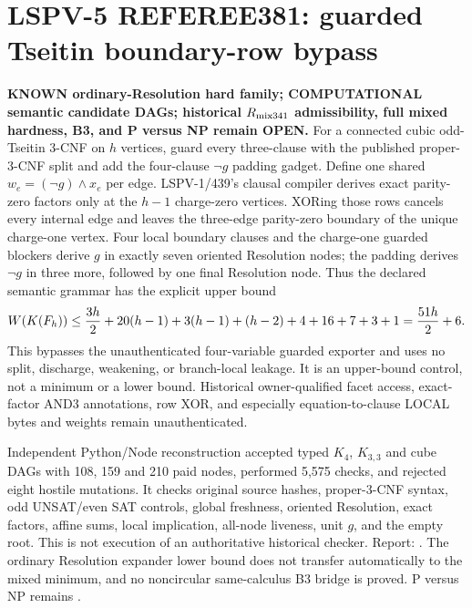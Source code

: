 \section*{LSPV-5 REFEREE381: guarded Tseitin boundary-row bypass}
\textbf{KNOWN ordinary-Resolution hard family; COMPUTATIONAL semantic candidate DAGs; historical $R_{\rm mix341}$ admissibility, full mixed hardness, B3, and P versus NP remain OPEN.}
For a connected cubic odd-Tseitin 3-CNF on $h$ vertices, guard every
three-clause with the published proper-3-CNF split and add the four-clause
$\neg g$ padding gadget.  Define one shared
$w_e=(\neg g)\wedge x_e$ per edge.  LSPV-1/439's clausal compiler derives
exact parity-zero factors only at the $h-1$ charge-zero vertices.  XORing
those rows cancels every internal edge and leaves the three-edge parity-zero
boundary of the unique charge-one vertex.  Four local boundary clauses and
the charge-one guarded blockers derive $g$ in exactly seven oriented
Resolution nodes; the padding derives $\neg g$ in three more, followed by one
final Resolution node.  Thus the declared semantic grammar has the explicit
upper bound
\[
 W(K(F_h))\le {3h\over2}+20(h-1)+3(h-1)+(h-2)+4+16+7+3+1
 ={51h\over2}+6.
\]
This bypasses the unauthenticated four-variable guarded exporter and uses no
split, discharge, weakening, or branch-local leakage.  It is an upper-bound
control, not a minimum or a lower bound.  Historical owner-qualified facet
access, exact-factor AND3 annotations, row XOR, and especially
equation-to-clause LOCAL bytes and weights remain unauthenticated.

Independent Python/Node reconstruction accepted typed $K_4$, $K_{3,3}$ and
cube DAGs with 108, 159 and 210 paid nodes, performed 5,575 checks, and
rejected eight hostile mutations.  It checks original source hashes,
proper-3-CNF syntax, odd UNSAT/even SAT controls, global freshness, oriented
Resolution, exact factors, affine sums, local implication, all-node liveness,
unit $g$, and the empty root.  This is not execution of an authoritative
historical checker.  Report:
.
The ordinary Resolution expander lower bound does not transfer automatically
to the mixed minimum, and no noncircular same-calculus B3 bridge is proved.
P versus NP remains \OPEN.
